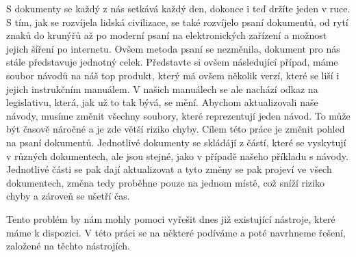 S dokumenty se každý z nás setkává každý den, dokonce i teď držíte jeden v ruce. S tím, jak se rozvíjela lidská civilizace,
se také rozvíjelo psaní dokumentů, od rytí znaků do krunýřů až po moderní psaní na elektronických zařízení a možnost jejich šíření po internetu.
Ovšem metoda psaní se nezměnila, dokument pro nás stále představuje jednotný celek. Představte si ovšem následující případ, máme soubor návodů na náš top
produkt, který má ovšem několik verzí, které se liší i jejich instrukčním manuálem. V našich manuálech se ale nachází odkaz na legislativu, která, jak už to tak
bývá, se mění. Abychom aktualizovali naše návody, musíme změnit všechny soubory, které reprezentují jeden návod. To může být časově náročné a je zde větší riziko
chyby. Cílem této práce je změnit pohled na psaní dokumentů. Jednotlivé dokumenty se skládájí z částí, které se vyskytují v různých dokumentech, ale jsou stejné,
jako v případě našeho příkladu s návody. Jednotlivé části se pak dají aktualizovat a tyto změny se pak projeví ve všech dokumentech, změna tedy proběhne
pouze na jednom místě, což sníží riziko chyby a zároveň se ušetří čas.

Tento problém by nám mohly pomoci vyřešit dnes již existující nástroje, které máme k dispozici. V této práci se na některé podíváme a poté navrhneme řešení, založené
na těchto nástrojích.